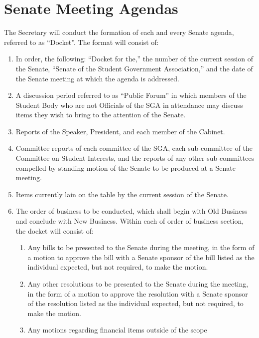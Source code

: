 \documentclass[12pt]{scrreprt}
\begin{document}
\section{Senate Meeting Agendas}
The Secretary will conduct the formation of each and every Senate agenda, 
referred to as ``Docket''. The format will consist of: 
\begin{enumerate}
    \item In order, the following: ``Docket for the,'' the number of the 
          current session of the Senate, ``Senate of the Student Government 
          Association,'' and the date of the Senate meeting at which the 
          agenda is addressed.
    \item A discussion period referred to as “Public Forum” in which members of the Student Body who are not Officials of the SGA in attendance may discuss items they wish to bring to the attention of the Senate.
    \item Reports of the Speaker, President, and each member of the Cabinet.
    \item Committee reports of each committee of the SGA, each sub-committee 
          of the Committee on Student Interests, and the reports of any other 
          sub-committees compelled by standing motion of the Senate to be 
          produced at a Senate meeting. 
    \item Items currently lain on the table by the current session of the 
          Senate. 
    \item The order of business to be conducted, which shall begin with Old 
          Business and conclude with New Business. Within each of order of 
          business section, the docket will consist of: 
        \begin{enumerate}
            \item Any bills to be presented to the Senate during the meeting, 
                  in the form of a motion to approve the bill with a Senate 
                  sponsor of the bill listed as the individual expected, but 
                  not required, to make the motion. 
            \item Any other resolutions to be presented to the Senate during 
                  the meeting, in the form of a motion to approve the 
                  resolution with a Senate sponsor of the resolution listed as 
                  the individual expected, but not required, to make the 
                  motion. 
            \item Any motions regarding financial items outside of the scope 

\end{enumerate}
\end{enumerate}
\end{document}
